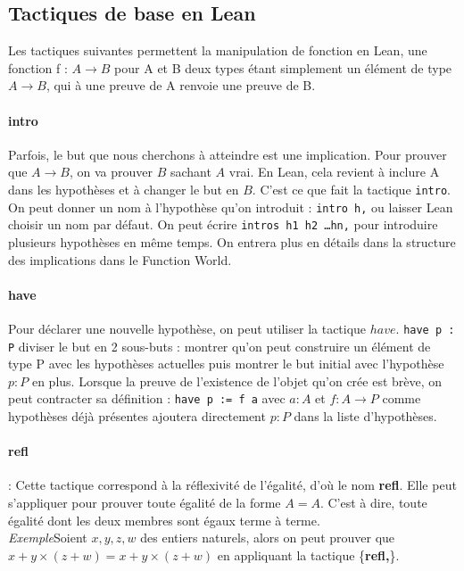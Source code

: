 \subsection{Tactiques de base en Lean}


Les tactiques suivantes permettent la manipulation de fonction en Lean, une fonction f : $A\to B$ pour A et B deux types étant simplement un élément de type $A\to B$, qui à une preuve de A renvoie une preuve de B.\\

\paragraph{intro}

Parfois, le but que nous cherchons à atteindre est une implication. Pour prouver que $A \to B$, on va prouver $B$ sachant $A$ vrai. En Lean, cela revient à inclure A dans les hypothèses et à changer le but en $B$. C'est ce que fait la tactique \texttt{intro}. On peut donner un nom à l'hypothèse qu'on introduit : \texttt{intro h,} ou laisser Lean choisir un nom par défaut.
On peut écrire \texttt{intros h1 h2 \ldots hn,} pour introduire plusieurs hypothèses en même temps.
On entrera plus en détails dans la structure des implications dans le Function World.

\paragraph{have}

Pour déclarer une nouvelle hypothèse, on peut utiliser la tactique $have$.
\texttt{have p : P} diviser le but en 2 sous-buts : montrer qu'on peut construire un élément de type P avec les hypothèses actuelles puis montrer le but initial avec l'hypothèse $p : P$ en plus.
Lorsque la preuve de l'existence de l'objet qu'on crée est brève, on peut contracter sa définition :
\texttt{have p := f a} avec $a : A$ et $f : A \to P$ comme hypothèses déjà présentes ajoutera directement $p : P$ dans la liste d'hypothèses.  


\paragraph {refl}: Cette tactique correspond à la réflexivité de l'égalité, d'où le nom \textbf{refl}. Elle peut s'appliquer pour prouver toute égalité de la forme $A=A$. C'est à dire, toute égalité dont les deux membres sont égaux terme à terme. \\
\textit{Exemple}Soient $x,y,z,w$ des entiers naturels, alors on peut prouver que $x+y \times (z+w)=x+y \times (z+w)$ en appliquant la tactique \big\{\textbf{refl,}\big\}.
